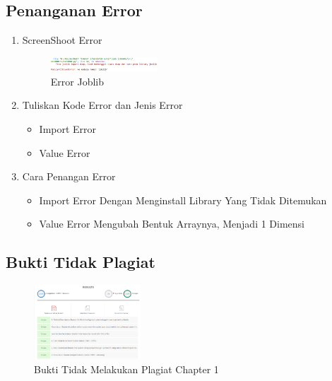 \subsection{Penanganan Error}
\begin{enumerate}
	\item ScreenShoot Error
	\begin{figure}[H]
		\includegraphics[width=4cm]{figures/1174008/error/error.PNG}
		\centering
		\caption{ Error Joblib}
	\end{figure}

	\item Tuliskan Kode Error dan Jenis Error
	\begin{itemize}
		\item Import Error
		\item Value Error
	\end{itemize}

	\item Cara Penangan Error
	\begin{itemize}
		\item Import Error
		\hfill\break
		Dengan Menginstall Library Yang Tidak Ditemukan
		\item Value Error
		\hfill\break
		Mengubah Bentuk Arraynya, Menjadi 1 Dimensi
	\end{itemize}
\end{enumerate}

\subsection{Bukti Tidak Plagiat}
\begin{figure}[H]
	\includegraphics[width=4cm]{figures/1174008/bukti/CekPlagiarisme.PNG}
	\centering
	\caption{Bukti Tidak Melakukan Plagiat Chapter 1}
\end{figure}
